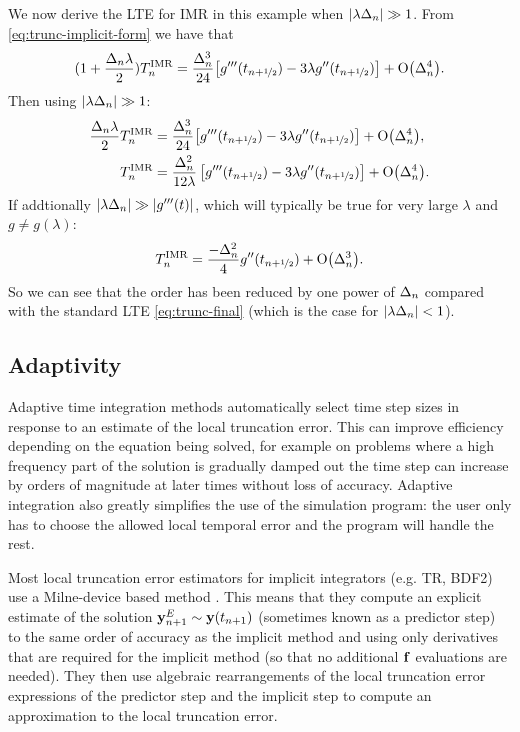 We now derive the LTE for IMR in this example when $\left|{\lambda\Delta_{n}} \right| \gg 1$.
From \cref{eq:trunc-implicit-form} we have that
\begin{equation}
  \begin{aligned}
    (1 + \frac{\Delta_{n} \lambda}{2})T_n^{\text{IMR}} &= \frac{\Delta_{n}^3}{24}
    {\left[ g'''(t_{n+\nicefrac{1}{2}}) - 3 \lambda g''(t_{n+\nicefrac{1}{2}}) \right]} + \text{O}{\left( \Delta_{n}^4 \right)}. \\ 
  \end{aligned}
\end{equation}
Then using $\left|{\lambda\Delta_{n}} \right| \gg 1$:
\begin{equation}
  \begin{aligned}
    \frac{\Delta_{n} \lambda}{2} T_n^{\text{IMR}} &= \frac{\Delta_{n}^3}{24}
    {\left[ g'''(t_{n+\nicefrac{1}{2}}) - 3 \lambda g''(t_{n+\nicefrac{1}{2}}) \right]} + \text{O}{\left( \Delta_{n}^4 \right)}, \\ 
    T_n^{\text{IMR}} &= \frac{\Delta_{n}^2}{12\lambda} \left[g'''(t_{n+\nicefrac{1}{2}}) - 3 \lambda g''(t_{n+\nicefrac{1}{2}}) \right] + \text{O}{\left( \Delta_{n}^4 \right)}. \\
  \end{aligned}
\end{equation}
If addtionally $\left|{\lambda\Delta_{n}} \right| \gg \left|{g'''(t)} \right|$, which will typically be true for very large $\lambda$ and $g \neq g(\lambda)$:
\begin{equation}
  T_n^{\text{IMR}} = \frac{-\Delta_{n}^2}{4} g''(t_{n+\nicefrac{1}{2}}) + \text{O}{\left( \Delta_{n}^3 \right)}.
  \label{eq:reduced-order-imr-truncation-error}
\end{equation}
So we can see that the order has been reduced by one power of $\Delta_{n}$ compared with the standard LTE \cref{eq:trunc-final} (which is the case for $\left|{\lambda\Delta_{n}} \right| < 1$).


\subsection{Adaptivity}
\label{sec:adaptivity}

Adaptive time integration methods automatically select time step sizes in response to an estimate of the local truncation error.
This can improve efficiency depending on the equation being solved, for example on problems where a high frequency part of the solution is gradually damped out the time step can increase by orders of magnitude at later times without loss of accuracy.
Adaptive integration also greatly simplifies the use of the simulation program: the user only has to choose the allowed local temporal error and the program will handle the rest.

Most local truncation error estimators for implicit integrators (e.g. TR, BDF2) use a Milne-device based method \cite[707-716]{GreshoSani}.
This means that they compute an explicit estimate of the solution $\mathbf{y}^E_{n+1} \sim \mathbf{y}(t_{n+1})$  (sometimes known as a predictor step) to the same order of accuracy as the implicit method and using only derivatives that are required for the implicit method (so that no additional ${\mathbf{f}}$ evaluations are needed).
They then use algebraic rearrangements of the local truncation error expressions of the predictor step and the implicit step to compute an approximation to the local truncation error.

